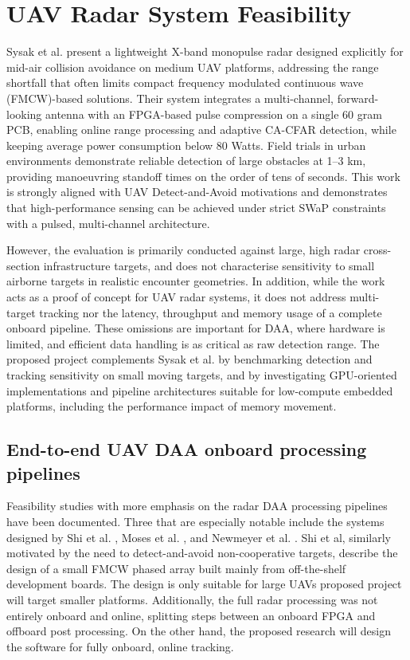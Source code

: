 \section{UAV Radar System Feasibility}

Sysak et al. \cite{sysak2025_lightweight_compact_pulse_radar_uav_collision_avoidance} present a lightweight X-band monopulse radar designed explicitly for mid-air collision avoidance on medium UAV platforms, addressing the range shortfall that often limits compact frequency modulated continuous wave (FMCW)-based solutions. Their system integrates a multi-channel, forward-looking antenna with an FPGA-based pulse compression on a single 60 gram PCB, enabling online range processing and adaptive CA-CFAR detection, while keeping average power consumption below 80 Watts. Field trials in urban environments demonstrate reliable detection of large obstacles at 1–3 km, providing manoeuvring standoff times on the order of tens of seconds. This work is strongly aligned with UAV Detect-and-Avoid motivations and demonstrates that high-performance sensing can be achieved under strict SWaP constraints with a pulsed, multi-channel architecture. 

However, the evaluation is primarily conducted against large, high radar cross-section infrastructure targets, and does not characterise sensitivity to small airborne targets in realistic encounter geometries. In addition, while the work acts as a proof of concept for UAV radar systems, it does not address multi-target tracking nor the latency, throughput and memory usage of a complete onboard pipeline. These omissions are important for DAA, where hardware is limited, and efficient data handling is as critical as raw detection range. The proposed project complements Sysak et al. by benchmarking detection and tracking sensitivity on small moving targets, and by investigating GPU-oriented implementations and pipeline architectures suitable for low-compute embedded platforms, including the performance impact of memory movement.


\subsection{End-to-end UAV DAA onboard processing pipelines}
Feasibility studies with more emphasis on the radar DAA processing pipelines have been documented. Three that are especially notable include the systems designed by Shi et al. \cite{6712628}, Moses et al. \cite{6044363}, and Newmeyer et al. \cite{7577322}. Shi et al, similarly motivated by the need to detect-and-avoid non-cooperative targets, describe the design of a small FMCW phased array built mainly from off-the-shelf development boards. The design is only suitable for large UAVs proposed project will target smaller platforms. Additionally, the full radar processing was not entirely onboard and online, splitting steps between an onboard FPGA and offboard post processing. On the other hand, the proposed research will design the software for fully onboard, online tracking. 

